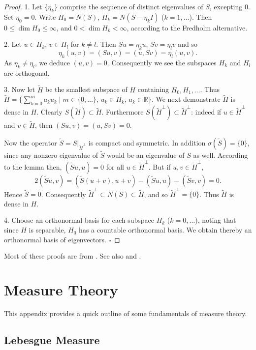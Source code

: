 \begin{proof}
1. Let $\{\eta_k\}$ comprise the sequence of distinct eigenvalues of $S$, excepting 0. Set $\eta_0 = 0$. Write $H_0 = N(S)$, $H_k = N(S - \eta_k I)$ ($k = 1, \ldots$). Then $0 \leq \dim H_0 \leq \infty$, and $0 < \dim H_k < \infty$, according to the Fredholm alternative.

2. Let $u \in H_k$, $v \in H_l$ for $k \neq l$. Then $Su = \eta_k u$, $Sv = \eta_l v$ and so
$$\eta_k (u, v) = (Su, v) = (u, Sv) = \eta_l (u, v).$$
As $\eta_k \neq \eta_l$, we deduce $(u, v) = 0$. Consequently we see the subspaces $H_k$ and $H_l$ are orthogonal.

3. Now let $\tilde{H}$ be the smallest subspace of $H$ containing $H_0, H_1, \ldots$. Thus $\tilde{H} = \{\sum_{k=0}^m a_k u_k \mid m \in \{0, \ldots\}$, $u_k \in H_k$, $a_k \in \mathbb{R}\}$. We next demonstrate $\tilde{H}$ is dense in $H$. Clearly $S(\tilde{H}) \subset \tilde{H}$. Furthermore $S(\tilde{H}^\perp) \subset \tilde{H}^\perp$: indeed if $u \in \tilde{H}^\perp$ and $v \in \tilde{H}$, then $(Su, v) = (u, Sv) = 0$.

Now the operator $\tilde{S} = S|_{\tilde{H}^\perp}$ is compact and symmetric. In addition $\sigma(\tilde{S}) = \{0\}$, since any nonzero eigenvalue of $\tilde{S}$ would be an eigenvalue of $S$ as well. According to the lemma then, $(\tilde{S}u, u) = 0$ for all $u \in \tilde{H}^\perp$. But if $u, v \in \tilde{H}^\perp$,
$$2(\tilde{S}u, v) = (\tilde{S}(u + v), u + v) - (\tilde{S}u, u) - (\tilde{S}v, v) = 0.$$
Hence $\tilde{S} = 0$. Consequently $\tilde{H}^\perp \subset N(S) \subset \tilde{H}$, and so $\tilde{H}^\perp = \{0\}$. Thus $\tilde{H}$ is dense in $H$.

4. Choose an orthonormal basis for each subspace $H_k$ ($k = 0, \ldots$), noting that since $H$ is separable, $H_0$ has a countable orthonormal basis. We obtain thereby an orthonormal basis of eigenvectors. $\square$
\end{proof}

Most of these proofs are from \cite{Brezis1983}. See also \cite[Chapter 5]{GilbargTrudinger1983} and \cite{Yosida1980}.

\section{Measure Theory}
\label{sec:measure-theory}

This appendix provides a quick outline of some fundamentals of measure theory.

\subsection{Lebesgue Measure}
\label{sec:lebesgue-measure}

